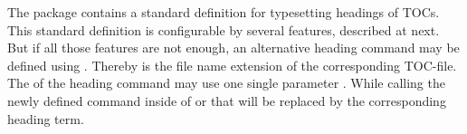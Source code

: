 \begin{Declaration}
\end{Declaration}
The package  contains a standard definition for typesetting
headings of TOCs. This standard definition is configurable by several
features, described at  next. But if all those features are
not enough, an alternative heading command may be defined using
. Thereby  is the file name extension of
the corresponding TOC-file. The  of the heading command may
use one single parameter . While calling the newly defined command
inside of  or  that  will be
replaced by the corresponding heading term.%
\EndIndexGroup


